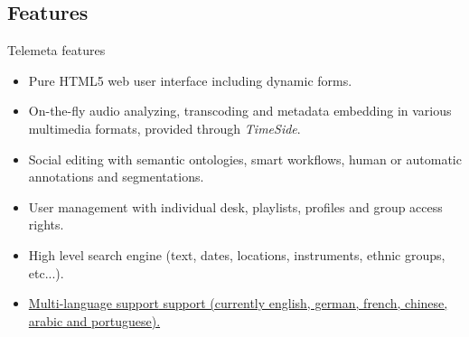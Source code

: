 \documentclass[final, hyperref, table]{beamer}
\begin{document}
\subsection{Features}
\begin{frame}[label=telemeta_features]{Telemeta features}
  \begin{block}{}
    \begin{itemize}
      \item \alert{Pure HTML5} web user interface including dynamic forms.
      \item \alert{On-the-fly audio analyzing}, transcoding and metadata
        embedding in various multimedia formats, provided through \emph{TimeSide}.
      \item \alert{Social editing} with semantic ontologies, smart workflows, human or automatic annotations and segmentations.
      \item \alert{User management} with individual desk, playlists, profiles
        and group access rights.
      \item \alert{High level search engine} (text, dates, locations, instruments, ethnic groups, etc...).
      \item \hyperlink{telemeta_languages}{\alert{Multi-language support} support (currently english, german, french, chinese, arabic and portuguese).}
      \end{itemize}
    \end{block}
\end{frame}
\end{document}
